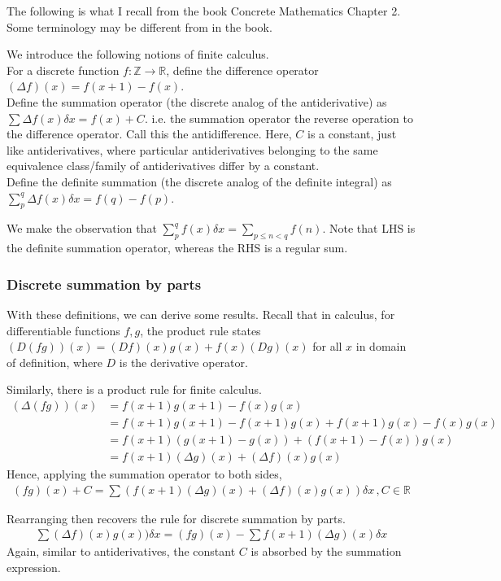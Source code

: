 \documentclass{article}
\begin{document}
The following is what I recall from the book Concrete Mathematics Chapter 2. Some terminology may be different from in the book.

We introduce the following notions of finite calculus.\\
For a discrete function $f: \mathbb{Z} \rightarrow \mathbb{R}$, define the difference operator $(\Delta f)(x) = f(x+1) - f(x)$.\\
Define the summation operator (the discrete analog of the antiderivative) as $\sum \Delta f(x) \delta x=f(x)+C$. i.e. the summation operator the reverse operation to the difference operator. Call this the antidifference. Here, $C$ is a constant, just like antiderivatives, where particular antiderivatives belonging to the same equivalence class/family of antiderivatives differ by a constant. \\
Define the definite summation (the discrete analog of the definite integral) as $\sum_p^q \Delta f(x) \delta x = f(q) - f(p)$.

We make the observation that $\sum_p^q f(x) \delta x = \sum_{p\leq n < q}f(n)$. Note that LHS is the definite summation operator, whereas the RHS is a regular sum.

\subsubsection{Discrete summation by parts}
With these definitions, we can derive some results. Recall that in calculus, for differentiable functions $f,g$, the product rule states $(D(fg))(x) = (Df)(x)g(x) + f(x)(Dg)(x)$ for all $x$ in domain of definition, where $D$ is the derivative operator.

Similarly, there is a product rule for finite calculus.
\begin{align*}
	(\Delta (fg))(x) &= f(x+1)g(x+1) - f(x)g(x)\\
	&= f(x+1)g(x+1) - f(x+1)g(x) + f(x+1)g(x) - f(x)g(x)\\
	&= f(x+1)(g(x+1)-g(x)) + (f(x+1)-f(x))g(x)\\
	&= f(x+1)(\Delta g)(x) + (\Delta f)(x)g(x)
\end{align*}
Hence, applying the summation operator to both sides,
\begin{align*}
	(fg)(x) + C = \sum (f(x+1)(\Delta g)(x) + (\Delta f)(x)g(x)) \delta x\, , C\in \mathbb{R}
\end{align*}

Rearranging then recovers the rule for discrete summation by parts.
\begin{align*}
	\sum (\Delta f)(x)g(x)) \delta x = (fg)(x) - \sum f(x+1)(\Delta g)(x) \delta x
\end{align*}
Again, similar to antiderivatives, the constant $C$ is absorbed by the summation expression.
\end{document}
